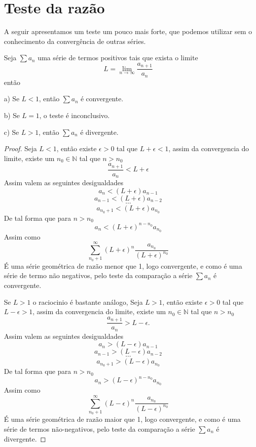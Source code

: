 \section{Teste da razão}
\construirSec

A seguir apresentamos um teste um pouco mais forte, que podemos utilizar sem o
conhecimento da convergência de outras séries.

\begin{teo}
    Seja $\sum a_n$ uma série de termos positivos tais que exista o limite
    $$ L = \lim_{n \to \infty} \frac{a_{n+1}}{a_n} $$
    então
    \item [a)] Se $L < 1$, então $\sum a_n$ é convergente.
    \item [b)] Se $L = 1$, o teste é inconclusivo.
    \item [c)] Se $L > 1$, então $\sum a_n$ é divergente.
\end{teo}

\begin{proof}
    Seja $L<1$, então existe $\epsilon > 0$ tal que $L + \epsilon < 1$, assim
    da convergencia do limite, existe um $n_0 \in \mathbb{N}$ tal que $n>n_0$
    $$ \frac{a_{n+1}}{a_n} < L + \epsilon$$
    Assim valem as seguintes desigualdades
    $$ a_{n} < (L + \epsilon)a_{n-1}$$
    $$ a_{n-1} < (L + \epsilon)a_{n-2}$$
    $$ \cdots $$
    $$ a_{n_0+1} < (L + \epsilon)a_{n_0}$$
    De tal forma que para $n > n_0$
    $$ a_n < (L + \epsilon)^{n-n_0}a_{n_0}$$    
    Assim como 
    $$\sum_{n_0+1}^{\infty} (L + \epsilon)^{n}\frac{a_{n_0}}{(L + \epsilon)^{n_0}} $$
    É uma série geométrica de razão menor que 1, logo convergente, e como
    é uma série de termo não negativos, pelo teste da comparação a série $\sum a_n$
    é convergente.

    Se $L>1$ o raciocinio é bastante análogo, Seja $L>1$, então existe $\epsilon > 0$
    tal que $L - \epsilon > 1$, assim da convergencia do limite, existe um
    $n_0 \in \mathbb{N}$ tal que $n>n_0$
    $$ \frac{a_{n+1}}{a_n} > L - \epsilon.$$
    Assim valem as seguintes desigualdades
    $$ a_{n} > (L - \epsilon)a_{n-1}$$
    $$ a_{n-1} > (L - \epsilon)a_{n-2}$$
    $$ \cdots $$
    $$ a_{n_0+1} > (L - \epsilon)a_{n_0}$$
    De tal forma que para $n > n_0$
    $$ a_n > (L - \epsilon)^{n-n_0}a_{n_0}$$    
    Assim como 
    $$\sum_{n_0+1}^{\infty} (L - \epsilon)^{n}\frac{a_{n_0}}{(L - \epsilon)^{n_0}} $$
    É uma série geométrica de razão maior que 1, logo convergente, e como
    é uma série de termos não-negativos, pelo teste da comparação a série $\sum a_n$
    é divergente.
\end{proof}
